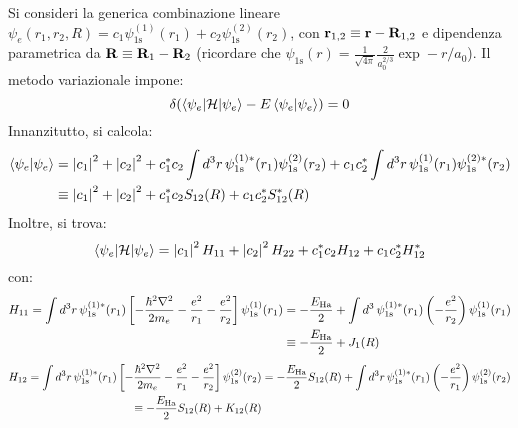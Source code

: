 Si consideri la generica combinazione lineare $ \psi_e(r_1,r_2,R) = c_1 \psi_\text{1s}^{(1)}(r_1) + c_2 \psi_\text{1s}^{(2)}(r_2) $, con $ \mathbf{r}_{1,2} \equiv \mathbf{r} - \mathbf{R}_{1,2} $ e dipendenza parametrica da $ \mathbf{R} \equiv \mathbf{R}_1 - \mathbf{R}_2 $ (ricordare che $ \psi_\text{1s}(r) = \frac{1}{\sqrt{4\pi}} \frac{2}{a_0^{2/3}} \exp -r/a_0 $). Il metodo variazionale impone:
\begin{equation}
	\delta( \braket{\psi_e | \mathcal{H} | \psi_e} - E \braket{\psi_e | \psi_e}) = 0
	\label{eq:h2-var}
\end{equation}
Innanzitutto, si calcola:
\begin{equation*}
	\begin{split}
		\braket{\psi_e | \psi_e}
		& = \left\lvert c_1\right\rvert^2 + \left\lvert c_2\right\rvert^2 + c_1^* c_2 \int d^3r\, \psi_\text{1s}^{(1)*}(r_1) \psi_\text{1s}^{(2)}(r_2) + c_1 c_2^* \int d^3r\, \psi_\text{1s}^{(1)}(r_1) \psi_\text{1s}^{(2)*}(r_2) \\
		& \equiv \left\lvert c_1\right\rvert^2 + \left\lvert c_2\right\rvert^2 + c_1^* c_2 S_{12}(R) + c_1 c_2^* S_{12}^*(R)
	\end{split}
\end{equation*}
Inoltre, si trova:
\begin{equation*}
	\braket{\psi_e | \mathcal{H} | \psi_e} = \left\lvert c_1\right\rvert^2 H_{11} + \left\lvert c_2\right\rvert^2 H_{22} + c_1^* c_2 H_{12} + c_1 c_2^* H_{12}^*
\end{equation*}
con:
\begin{equation*}
	\begin{split}
		H_{11} = \int d^3r\, \psi_\text{1s}^{(1)*}(r_1) \left[ - \frac{\hbar^2 \nabla^2}{2m_e} - \frac{e^2}{r_1} - \frac{e^2}{r_2} \right] \psi_\text{1s}^{(1)}(r_1)
		& = - \frac{E_\text{Ha}}{2} + \int d^3\, \psi_\text{1s}^{(1)*}(r_1) \left( -\frac{e^2}{r_2} \right) \psi_\text{1s}^{(1)}(r_1) \\
		& \equiv - \frac{E_\text{Ha}}{2} + J_1(R)
	\end{split}
\end{equation*}
\begin{equation*}
	\begin{split}
		H_{12} = \int d^3r\, \psi_\text{1s}^{(1)*}(r_1) \left[ - \frac{\hbar^2 \nabla^2}{2m_e} - \frac{e^2}{r_1} - \frac{e^2}{r_2} \right] \psi_\text{1s}^{(2)}(r_2)
		& = - \frac{E_\text{Ha}}{2} S_{12}(R) + \int d^3r\, \psi_\text{1s}^{(1)*}(r_1) \left( - \frac{e^2}{r_1} \right) \psi_\text{1s}^{(2)}(r_2) \\
		\equiv - \frac{E_\text{Ha}}{2} S_{12}(R) + K_{12}(R)
	\end{split}
\end{equation*}
